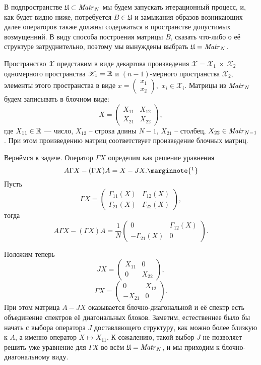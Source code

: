 В подпространстве \( \mathfrak U \subset \mathit{Matr}_{N} {} \)
мы будем запускать итерационный процесс,
и, как будет видно ниже, потребуется \( B \in \mathfrak U \)
и замыкания образов возникающих далее операторов также
должны содержаться в
пространстве допустимых возмущенний.
В виду способа построения матрицы \( B \), сказать что-либо о её структуре затруднительно,
поэтому мы вынуждены выбрать \( \mathfrak U = \mathit{Matr}_{N} {}\).

Пространство \( \mathscr{X} \) представим в виде
декартова произведения
\( \mathscr{X} = \mathscr{X}_1~\times~\mathscr{X}_2 \)
одномерного пространства \( \mathscr{X}_1=\mathbb{R} \)
и \((n-1)\)-мерного пространства \( \mathscr{X}_2 \),
элементы этого пространства в виде
\( x=\begin{pmatrix}x_1\\x_2\end{pmatrix}, \)
\( x_i\in\mathscr{X}_i \).
Матрицы из \( \mathit{Matr}_{N} {} \) будем записывать
в блочном виде:
\[
    X = \begin{pmatrix}
    X_{11} & X_{12} \\
    X_{21} & X_{22}
    \end{pmatrix},
    \]
где \( X_{11}\in\mathbb{R} \) --- число,
    \( X_{12} \) -- строка длины \( N-1 \),
    \( X_{21} \) -- столбец,
    \( X_{22} \in \mathit{Matr}_{N-1} {} \).
При этом произведению матриц соответствует произведение блочных матриц.

Вернёмся к задаче.
Оператор \( \Gamma X \) определим как решение уравнения
\[
    A\Gamma X - (\Gamma X) A = X - JX.
    \marginnote{
        \footnotemark}
    \]
Пусть
\[ \Gamma X =
\begin{pmatrix}
    \Gamma_{11}(X) & \Gamma_{12}(X) \\
    \Gamma_{21}(X) & \Gamma_{22}(X)
\end{pmatrix}, \]
тогда
\[
    A \Gamma X - (\Gamma X) A =
    \frac{1}{N}
\begin{pmatrix}
    0               & \Gamma_{12}(X) \\
    -\Gamma_{21}(X) & 0
\end{pmatrix}
    . \]

Положим теперь
\[
    JX = \begin{pmatrix}
        X_{11} & 0 \\
        0      & X_{22}
    \end{pmatrix},
    \]
\[ \Gamma X =
    \begin{pmatrix}
        0       & X_{12} \\
        -X_{21} & 0
    \end{pmatrix}.
    \]
При этом матрица \( A - JX \) оказывается блочно-диагональной
и её спектр есть объединение спектров её диагональных блоков.
Заметим, естественнее было бы начать с выбора оператора \( J \) доставляющего структуру,
как можно более близкую к \( A \), а именно
оператор \( X\mapsto X_{11} \).
К сожалению, такой выбор \( J \) не позволяет решить
уже уравнение для \(\Gamma X\) во всём \(\mathfrak U = \mathit{Matr}_{N} {}\),
и мы приходим к блочно-диагональному виду.

